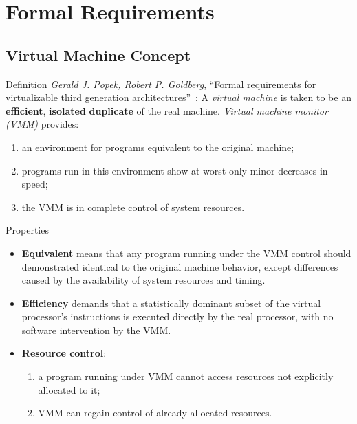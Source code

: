 \section{Formal Requirements}

\subsection{Virtual Machine Concept}

\begin{frame}{Definition}
\textit{Gerald J. Popek, Robert P. Goldberg}, ``Formal requirements for
virtualizable third generation architectures''~\cite{goldberg}:
\vfill\pause
A \textit{virtual machine} is taken to be an \textbf{efficient},
\textbf{isolated} \textbf{duplicate} of the real machine.
\vfill\pause
\textit{Virtual machine monitor (VMM)} provides:
\begin{enumerate}
\item an environment for programs equivalent to the original machine;\pause
\item programs run in this environment show at worst only minor decreases in
  speed;\pause
\item the VMM is in complete control of system resources.
\end{enumerate}
\end{frame}

\begin{frame}{Properties}
\begin{itemize}
\item \textbf{Equivalent} means that any program running under the
  VMM control should demonstrated identical to the original machine behavior,
  except differences caused by the availability of system resources and
  timing.\pause
\item \textbf{Efficiency} demands that a statistically dominant subset of the
  virtual processor's instructions is executed directly by the real processor,
  with no software intervention by the VMM.\pause
\item \textbf{Resource control}:
  \begin{enumerate}
  \item a program running under VMM cannot access resources not explicitly
    allocated to it;
  \item VMM can regain control of already allocated resources.
  \end{enumerate}
\end{itemize}
\end{frame}

